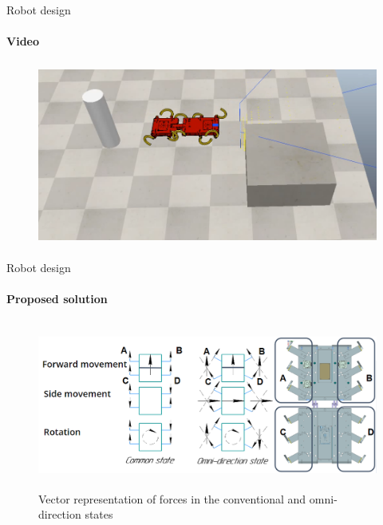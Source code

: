 \documentclass[aspectratio=169,xcolor=table]{beamer}
\begin{document}
\begin{frame}[t]{Robot design}
    \framesubtitle{Video}
    \vspace{-0.6cm}
    \begin{figure}[H]
        \href{https://youtu.be/EQ6oGZVDpoc}{
            \centering\includegraphics[height=6cm,width=1\textwidth,keepaspectratio]{sidestep_segment_video_preview.png}}
    \end{figure}
\end{frame}

\begin{frame}[t]{Robot design}
    \framesubtitle{Proposed solution}
    \vspace{-0.8cm}
    \begin{figure}[H]
        \centering\includegraphics[height=5.5cm,width=1\textwidth,keepaspectratio]{omni_rot.png}
        \caption*{Vector representation of forces in  the conventional and omni-direction states}
    \end{figure}
\end{frame}
\end{document}
